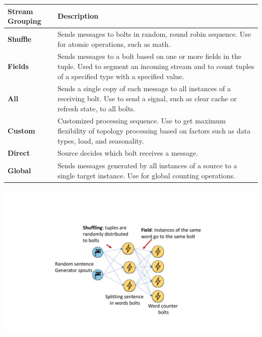 \begin{table}[!htp]
    \centering
    \begin{tabular}{@{} l p{24em} @{}}
        \toprule
        \textbf{Stream Grouping} & \textbf{Description} \\
        \midrule
        \textbf{Shuffle} & Sends messages to bolts in random, round robin sequence. Use for atomic operations, such as math. \\
        \cmidrule{1-2}
        \textbf{Fields} & Sends messages to a bolt based on one or more fields in the tuple. Used to segment an incoming stream and to count tuples of a specified type with a specified value. \\
        \cmidrule{1-2}
        \textbf{All} & Sends a single copy of each message to all instances of a receiving bolt. Use to send a signal, such as clear cache or refresh state, to all bolts. \\
        \cmidrule{1-2}
        \textbf{Custom} & Customized processing sequence. Use to get maximum flexibility of topology processing based on factors such as data types, load, and seasonality. \\
        \cmidrule{1-2}
        \textbf{Direct} & Source decides which bolt receives a message. \\
        \cmidrule{1-2}
        \textbf{Global} & Sends messages generated by all instances of a source to a single target instance. Use for global counting operations. \\
        \bottomrule
    \end{tabular}
\end{table}

\newpage

\begin{examplebox}
    \begin{center}
        \includegraphics[width=\textwidth]{img/apache-storm.pdf}
    \end{center}
\end{examplebox}